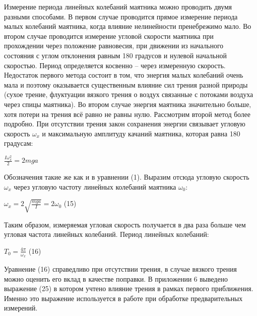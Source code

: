 \documentclass[a4paper]{article}
\begin{document}
Измерение периода линейных колебаний маятника можно проводить двумя разными способами. В первом случае проводится прямое измерение
периода малых колебаний маятника, когда влияние нелинейности пренебрежимо мало. Во втором случае проводится измерение угловой скорости
маятника при прохождении через положение равновесия, при движении
из начального состояния с углом отклонения равным 180 градусов и нулевой начальной скоростью. Период определяется косвенно – через измеренную скорость. Недостаток первого метода состоит в том, что энергия малых колебаний очень мала и поэтому оказывается существенным
влияние сил трения разной природы (сухое трение, флуктуации вязкого
трения о воздух связанные с потоками воздуха через спицы маятника).
Во втором случае энергия маятника значительно больше, хотя потери на
трения всё равно не равны нулю. Рассмотрим второй метод более подробно. При отсутствии трения закон сохранения энергии связывает угловую
скорость $\omega_x$ и максимальную амплитуду качаний маятника, которая равна 180 градусам:
\begin{center}$\frac{I\omega_x^2}{2}=2mga$\end{center}
Обозначения такие же как и в уравнении (1). Выразим отсюда угловую
скорость $\omega_x$ через угловую частоту линейных колебаний маятника $\omega_0$:
\begin{center}$\omega_x=2\sqrt{\frac{mga}{I}}=2\omega_0$ (15)\end{center}
Таким образом, измеряемая угловая скорость получается в два раза
больше чем угловая частота линейных колебаний. Период линейных колебаний:
\begin{center}$T_0=\frac{4\pi}{\omega_x}$ (16)\end{center}
Уравнение (16) справедливо при отсутствии трения, в случае вязкого
трения можно оценить его вклад в качестве поправки. В приложении
6 выведено выражение (25) в котором учтено влияние трения в рамках
первого приближения. Именно это выражение используется в работе при
обработке предварительных измерений.
\end{document}
